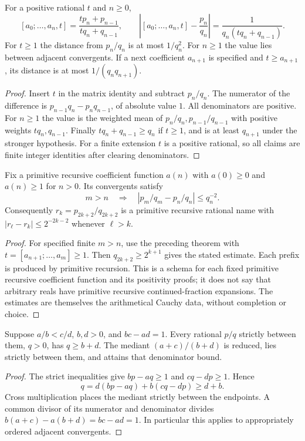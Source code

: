 \begin{theorem}\label{dio:cf-error}
For a positive rational $t$ and $n\geq0$,
\[
 [a_0;\ldots,a_n,t]
 =\frac{tp_n+p_{n-1}}{tq_n+q_{n-1}},\qquad
 \left|[a_0;\ldots,a_n,t]-\frac{p_n}{q_n}\right|
 =\frac1{q_n(tq_n+q_{n-1})}.
\]
For $t\geq1$ the distance from $p_n/q_n$ is at most $1/q_n^2$.
For $n\geq1$ the value lies between adjacent convergents.
If a next coefficient $a_{n+1}$ is specified and $t\geq a_{n+1}$,
its distance is at most $1/(q_nq_{n+1})$.
\end{theorem}
\begin{proof}
Insert $t$ in the matrix identity and subtract $p_n/q_n$.
The numerator of the difference is
$p_{n-1}q_n-p_nq_{n-1}$, of absolute value $1$.
All denominators are positive. For $n\geq1$ the value is the weighted
mean of $p_n/q_n,p_{n-1}/q_{n-1}$ with positive weights
$tq_n,q_{n-1}$. Finally $tq_n+q_{n-1}\geq q_n$ if $t\geq1$,
and is at least $q_{n+1}$ under the stronger hypothesis.
For a finite extension $t$ is a positive rational, so all claims are
finite integer identities after clearing denominators.
\end{proof}

\begin{corollary}
\label{dio:cf-real}
Fix a primitive recursive coefficient function $a(n)$ with $a(0)\geq0$
and $a(n)\geq1$ for $n>0$. Its convergents satisfy
\[
 m>n\quad\Longrightarrow\quad
 |p_m/q_m-p_n/q_n|\leq q_n^{-2}.
\]
Consequently $r_k=p_{2k+2}/q_{2k+2}$ is a primitive recursive rational
name with $|r_\ell-r_k|\leq2^{-2k-2}$ whenever $\ell>k$.
\end{corollary}
\begin{proof}
For specified finite $m>n$, use the preceding theorem with
$t=[a_{n+1};\ldots,a_m]\geq1$. Then
$q_{2k+2}\geq2^{k+1}$ gives the stated estimate.
Each prefix is produced by primitive recursion.
This is a schema for each fixed primitive recursive coefficient
function and its positivity proofs; it does not say that arbitrary
reals have primitive recursive continued-fraction expansions.
The estimates are themselves the arithmetical Cauchy data, without
completion or choice.
\end{proof}

\begin{theorem}\label{dio:farey}
Suppose $a/b<c/d$, $b,d>0$, and $bc-ad=1$.
Every rational $p/q$ strictly between them, $q>0$, has $q\geq b+d$.
The mediant $(a+c)/(b+d)$ is reduced, lies strictly between them,
and attains that denominator bound.
\end{theorem}
\begin{proof}
The strict inequalities give $bp-aq\geq1$ and $cq-dp\geq1$.
Hence
\[
 q=d(bp-aq)+b(cq-dp)\geq d+b.
\]
Cross multiplication places the mediant strictly between the endpoints.
A common divisor of its numerator and denominator divides
$b(a+c)-a(b+d)=bc-ad=1$.
In particular this applies to appropriately ordered adjacent convergents.
\end{proof}

